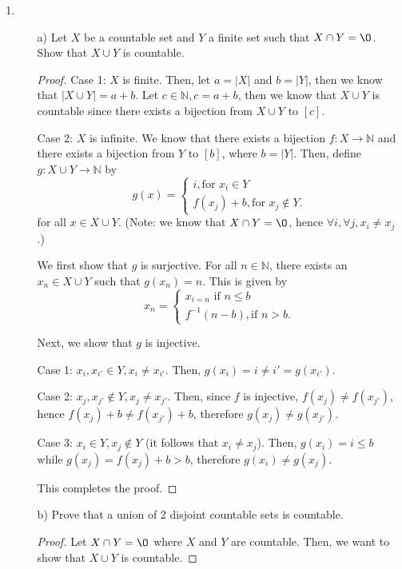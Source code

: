 \documentclass[11pt]{article}
\newcommand{\bbN}{\mathbb{N}}
\renewcommand{\emptyset}{\O}
\theoremstyle{definition}
\numberwithin{equation}{subsection}
\begin{document}
\begin{enumerate}
\item

\begin{enumerate}
\item[a)]  
Let $X$ be a countable set and $Y$ a finite set such that $X\cap Y=\emptyset$. Show that $X\cup Y$ is countable. 
\begin{proof}
Case 1: $X$ is finite. Then, let $a = |X|$ and $b = |Y|$, then we know that $|X \cup Y| = a + b$. Let $c \in \bbN, c = a+b$, then we know that $X \cup Y$ is countable since there exists a bijection from $X \cup Y$ to $[c]$.

Case 2: $X$ is infinite. We know that there exists a bijection $f \colon X \rightarrow \bbN$ and there exists a bijection from $Y$ to $[b]$, where $b = |Y|$. Then, define $g \colon X \cup Y \rightarrow \bbN$ by 
\[
g(x) =
\begin{cases}
i, \text{for } x_i \in Y \\
f(x_j)+b, \text{for } x_j \notin Y.
\end{cases}
\]
for all $x \in X \cup Y$. (Note: we know that $X \cap Y = \emptyset$, hence $\forall i, \forall j, x_i \not = x_j$.)

We first show that $g$ is surjective. For all $n \in \bbN$, there exists an $x_n \in X \cup Y$ such that $g(x_n)=n$. This is given by
\[
x_n =
\begin{cases}
x_{i=n} \text{ if } n \leq b\\
f^{-1}(n - b), \text{if } n > b.
\end{cases}
\]

Next, we show that $g$ is injective.

Case 1: $x_i,x_{i'} \in Y, x_i \not = x_{i'}$. Then, $g(x_i)=i \not = i' = g(x_{i'})$.

Case 2: $x_j,x_{j'} \notin Y, x_j \not = x_{j'}$. Then, since $f$ is injective, $f(x_j) \not= f(x_{j'})$, hence $f(x_j)+b \not= f(x_{j'})+b$, therefore $g(x_j) \not= g(x_{j'})$.

Case 3: $x_i \in Y, x_j \notin Y$ (it follows that $x_i \not = x_j$). Then, $g(x_i)=i \leq b$ while $g(x_j)=f(x_j)+b > b$, therefore $g(x_i) \not= g(x_{j})$.

This completes the proof.

\renewcommand\qedsymbol{QED}
\end{proof}


 \item[b)] Prove that a union of 2 disjoint countable sets is countable.
\begin{proof}
Let $X \cap Y =\emptyset$ where $X$ and $Y$ are countable. Then, we want to show that $X \cup Y$ is countable.


\end{proof}
\end{enumerate}
\end{enumerate}
\end{document}
